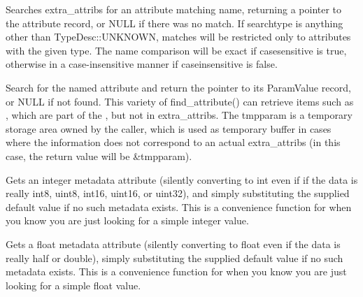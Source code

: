 
Searches {\cf extra_attribs} for an attribute matching {\cf name},
returning a pointer to the attribute record, or NULL if there was no
match.  If {\cf searchtype} is anything other than {\cf TypeDesc::UNKNOWN},
matches will be restricted only to attributes with the given type.
The name comparison will be exact if {\cf casesensitive} is true, otherwise
in a case-insensitive manner if {\cf caseinsensitive} is false.
\apiend

Search for the named attribute and return the pointer to its
{\cf ParamValue} record, or {\cf NULL} if not found.  This variety of
{\cf find_attribute(}) can retrieve items such as , which are
part of the \ImageSpec, but not in {\cf extra_attribs}. The {\cf tmpparam}
is a temporary storage area owned by the caller, which is used as temporary
buffer in cases where the information does not correspond to an actual
{\cf extra_attribs} (in this case, the return value will be {\cf \&tmpparam}).
\apiend

Gets an integer metadata attribute (silently converting to {\cf int}
even if if the data is really int8, uint8, int16, uint16, or uint32),
and simply substituting the supplied default value if no such metadata
exists.  This is a convenience function for when you know you are just
looking for a simple integer value.
\apiend

Gets a float metadata attribute (silently converting to {\cf float} even
if the data is really half or double), simply substituting the supplied
default value if no such metadata exists.  This is a convenience
function for when you know you are just looking for a simple float value.
\apiend

